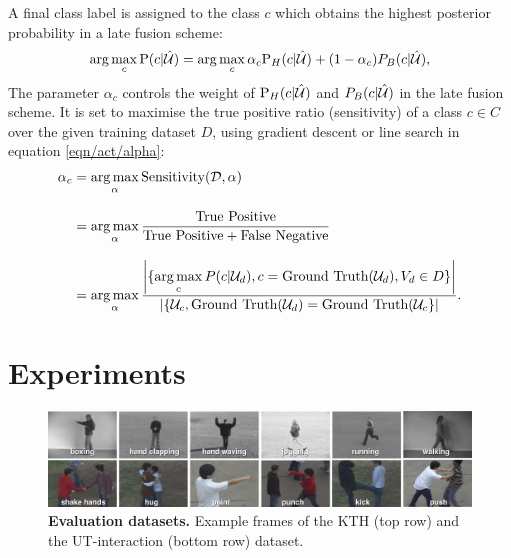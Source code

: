 A final class label is assigned to the class $c$ which obtains the highest posterior probability in a late fusion scheme:
\begin{equation}
	\arg\max_{c}
	\mathrm{P}(c|\mathcal{\hat{U}}) = 
	\arg\max_{c}
	\alpha_c \mathrm{P}_{H}(c|\mathcal{\hat{U}}) + (1 - \alpha_c) P_{B}(c|\mathcal{\hat{U}}),
	\label{eqn/act/combine}
\end{equation}
The parameter $\alpha_c$ controls the weight of $\mathrm{P}_{H}(c|\mathcal{\hat{U}})$ and $P_{B}(c|\mathcal{\hat{U}})$ in the late fusion scheme. It is set to maximise the true positive ratio (sensitivity) of a class $c \in C$ over the given training dataset $D$, using gradient descent or line search in equation \ref{eqn/act/alpha}:
\begin{equation}
\begin{aligned}
	\alpha_c & = \displaystyle\operatorname*{arg\,max}_{\alpha}\mbox{Sensitivity}(\mathcal{D},\alpha) \\[3mm]
	& = \displaystyle\operatorname*{arg\,max}_{\alpha}\displaystyle\frac{\mbox{True Positive}}{\mbox{True Positive} + \mbox{False Negative}} \\[3mm]
&= \displaystyle\operatorname*{arg\,max}_{\alpha}\displaystyle\frac{\left|\{\displaystyle\operatorname*{arg\,max}_{c}P(c|\mathcal{U}_d),c=\mbox{Ground Truth}(\mathcal{U}_d),V_d \in D\}\right|}{\left|\{\mathcal{U}_c, \mbox{Ground Truth}(\mathcal{U}_d) = \mbox{Ground Truth}(\mathcal{U}_c\}\right|}.
\end{aligned}
\label{eqn/act/alpha}
\end{equation}

\section{Experiments}
\label{sec/act/experiments}

\begin{figure}[th]
	\centering
	\includegraphics[width=1\linewidth]{fig/act/frames.png}
	\caption{\textbf{Evaluation datasets.} Example frames of the KTH (top row) and the UT-interaction (bottom row) dataset.}
	\label{fig/act/frames}
\end{figure}

